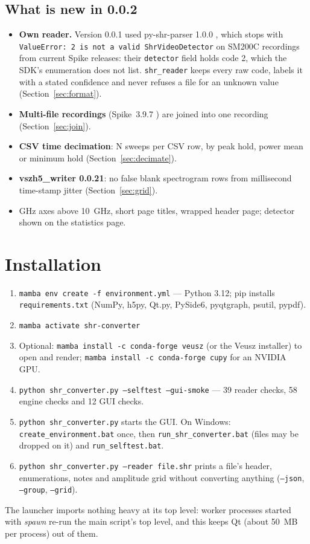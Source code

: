 \documentclass[11pt,a4paper]{article}
\newcommand{\code}[1]{\texttt{#1}}
\begin{document}
\subsection{What is new in 0.0.2}
\begin{itemize}[nosep]
\item \textbf{Own reader.} Version 0.0.1 used py-shr-parser 1.0.0 \cite{r10}, which stops with
      \code{ValueError: 2 is not a valid ShrVideoDetector} on SM200C recordings from current Spike releases:
      their \code{detector} field holds code 2, which the SDK's enumeration does not list. \code{shr\_reader}
      keeps every raw code, labels it with a stated confidence and never refuses a file for an unknown value
      (Section~\ref{sec:format}).
\item \textbf{Multi-file recordings} (Spike~3.9.7 \cite{r9}) are joined into one recording
      (Section~\ref{sec:join}).
\item \textbf{CSV time decimation}: N sweeps per CSV row, by peak hold, power mean or minimum hold
      (Section~\ref{sec:decimate}).
\item \textbf{vszh5\_writer 0.0.21}: no false blank spectrogram rows from millisecond time-stamp
      jitter (Section~\ref{sec:grid}).
\item GHz axes above 10~GHz, short page titles, wrapped header page; detector shown on the statistics page.
\end{itemize}

\section{Installation}
\begin{enumerate}[nosep]
\item \code{mamba env create -f environment.yml} --- Python 3.12; pip installs \code{requirements.txt}
      (NumPy, h5py, Qt.py, PySide6, pyqtgraph, psutil, pypdf).
\item \code{mamba activate shr-converter}
\item Optional: \code{mamba install -c conda-forge veusz} (or the Veusz installer) to open and render;
      \code{mamba install -c conda-forge cupy} for an NVIDIA GPU.
\item \code{python shr\_converter.py --selftest --gui-smoke} --- 39 reader checks, 58 engine checks
      and 12 GUI checks.
\item \code{python shr\_converter.py} starts the GUI. On Windows: \code{create\_environment.bat} once,
      then \code{run\_shr\_converter.bat} (files may be dropped on it) and \code{run\_selftest.bat}.
\item \code{python shr\_converter.py --reader file.shr} prints a file's header, enumerations, notes and
      amplitude grid without converting anything (\code{--json}, \code{--group}, \code{--grid}).
\end{enumerate}
The launcher imports nothing heavy at its top level: worker processes started with \emph{spawn} re-run the
main script's top level, and this keeps Qt (about 50~MB per process) out of them.
\end{document}
